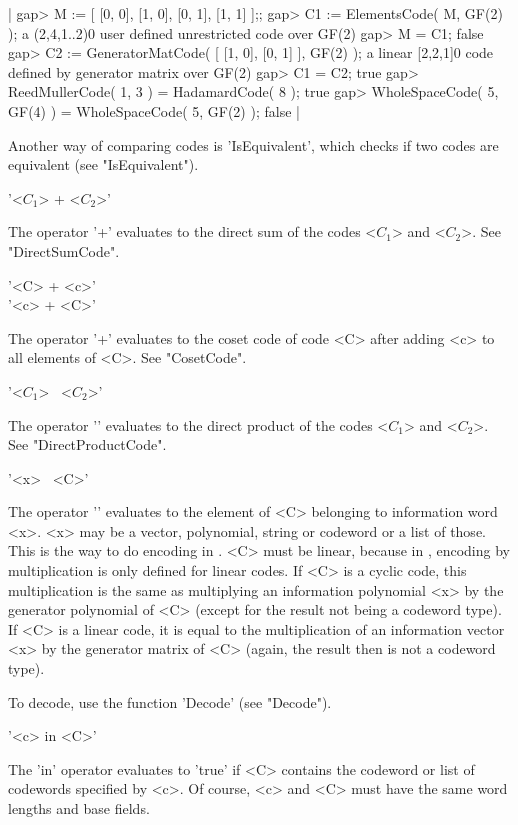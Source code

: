 |    gap> M := [ [0, 0], [1, 0], [0, 1], [1, 1] ];;
    gap> C1 := ElementsCode( M, GF(2) );
    a (2,4,1..2)0 user defined unrestricted code over GF(2)
    gap> M = C1;
    false
    gap> C2 := GeneratorMatCode( [ [1, 0], [0, 1] ], GF(2) );
    a linear [2,2,1]0 code defined by generator matrix over GF(2)
    gap> C1 = C2;
    true
    gap> ReedMullerCode( 1, 3 ) = HadamardCode( 8 );
    true
    gap> WholeSpaceCode( 5, GF(4) ) = WholeSpaceCode( 5, GF(2) );
    false |

Another way  of comparing codes  is 'IsEquivalent',  which  checks if two
codes are equi\-valent (see "IsEquivalent").


'<$C_1$> + <$C_2$>'

The  operator '+' evaluates to  the direct sum  of the  codes <$C_1$> and
<$C_2$>.  See "DirectSumCode".

'<C> + <c>'\\
'<c> + <C>'

The operator '+' evaluates to the coset code of code <C> after adding <c>
to all elements of <C>. See "CosetCode".

'<$C_1$> \*\ <$C_2$>'

The operator '\*'  evaluates to the direct  product of  the codes <$C_1$>
and <$C_2$>. See "DirectProductCode".

'<x> \*\ <C>'

The  operator  '\*' evaluates   to  the  element   of  <C>  belonging  to
information word <x>. <x> may be a vector, polynomial, string or codeword
or a list of those. This is the way to  do encoding in {\GUAVA}. <C> must
be  linear, because in  {\GUAVA},    encoding by multiplication is   only
defined for linear codes.   If <C> is  a cyclic code, this multiplication
is the same as multiplying an information polynomial <x> by the generator
polynomial of <C> (except  for the result  not being a codeword type). If
<C> is a linear code, it is equal to the multiplication of an information
vector <x> by the generator matrix of <C> (again, the  result then is not
a codeword type).

To decode, use the function 'Decode' (see "Decode").

'<c> in <C>'

The 'in' operator evaluates  to 'true'  if  <C> contains the  codeword or
list of codewords specified by <c>. Of course,  <c> and <C> must have the
same word lengths and base fields.

